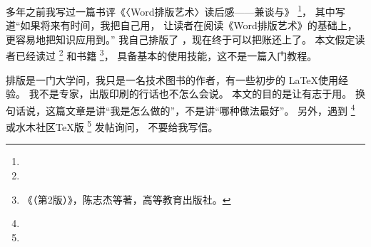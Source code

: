 多年之前我写过一篇书评《〈Word排版艺术〉读后感——兼谈与》
\footnote{}，
其中写道{\kaishu “如果将来有时间，我把自己用，
让读者在阅读《Word排版艺术》的基础上，更容易地把知识应用到。”}
我自己排版了 \mybooktitle，现在终于可以把账还上了。
本文假定读者已经读过
\footnote{}
和书籍
\footnote{《（第2版）》，陈志杰等著，高等教育出版社。}，
具备基本的使用技能，这不是一篇入门教程。

排版是一门大学问，我只是一名技术图书的作者，有一些初步的 \LaTeX 使用经验。
我不是专家，出版印刷的行话也不怎么会说。
本文的目的是让有志于用。
换句话说，这篇文章是讲“我是怎么做的”，不是讲“哪种做法最好”。
另外，遇到
\footnote{ } 或水木社区TeX版
\footnote{} 发帖询问，
不要给我写信。